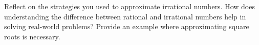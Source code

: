 \documentclass[10pt]{article}
\begin{document}
\vspace{1em}

\begin{tcolorbox}[colframe=black!60, colback=white, 
coltitle=black, colbacktitle=black!15, fonttitle=\bfseries\Large, 
title=Reflection, halign title=center, left=10pt, right=10pt, top=10pt, bottom=100pt]
Reflect on the strategies you used to approximate irrational numbers. How does understanding the difference between rational and irrational numbers help in solving real-world problems? Provide an example where approximating square roots is necessary.
\end{tcolorbox}
\end{document}
